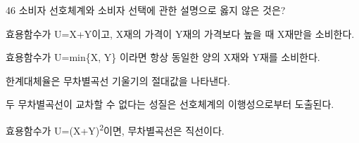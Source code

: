\begin{question}{46}
소비자 선호체계와 소비자 선택에 관한 설명으로 옳지 않은 것은?
\begin{choices}
  \item 효용함수가 U=X+Y이고, X재의 가격이 Y재의 가격보다 높을 때 X재만을 소비한다.
  \item 효용함수가 U=min\{X, Y\} 이라면 항상 동일한 양의 X재와 Y재를 소비한다.
  \item 한계대체율은 무차별곡선 기울기의 절대값을 나타낸다.
  \item 두 무차별곡선이 교차할 수 없다는 성질은 선호체계의 이행성으로부터 도출된다.
  \item 효용함수가 U=(X+Y)\textsuperscript{2}이면, 무차별곡선은 직선이다.
\end{choices}
\end{question}
